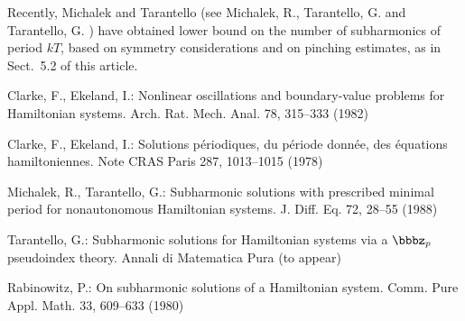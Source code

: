 \documentclass{llncs}
\begin{document}
    Recently, Michalek and Tarantello (see Michalek, R., Tarantello, G.
    \cite{2mich:tar} and Tarantello, G. \cite{2tar}) have obtained lower
    bound on the number of subharmonics of period $kT$, based on symmetry
    considerations and on pinching estimates, as in Sect.~5.2 of this
    article.
    
    \begin{thebibliography}{}
    Clarke, F., Ekeland, I.:
    Nonlinear oscillations and
    boundary-value problems for Hamiltonian systems.
    Arch. Rat. Mech. Anal. 78, 315--333 (1982)
    
    Clarke, F., Ekeland, I.:
    Solutions p\'{e}riodiques, du
    p\'{e}riode donn\'{e}e, des \'{e}quations hamiltoniennes.
    Note CRAS Paris 287, 1013--1015 (1978)
    
    Michalek, R., Tarantello, G.:
    Subharmonic solutions with prescribed minimal
    period for nonautonomous Hamiltonian systems.
    J. Diff. Eq. 72, 28--55 (1988)
    
    Tarantello, G.:
    Subharmonic solutions for Hamiltonian
    systems via a $\bbbz_{p}$ pseudoindex theory.
    Annali di Matematica Pura (to appear)
    
    Rabinowitz, P.:
    On subharmonic solutions of a Hamiltonian system.
    Comm. Pure Appl. Math. 33, 609--633 (1980)
    
    \end{thebibliography}
    \clearpage
    \renewcommand{\indexname}{Author Index}
    \printindex
    \clearpage
    \renewcommand{\indexname}{Subject Index}
    
    
\end{document}
